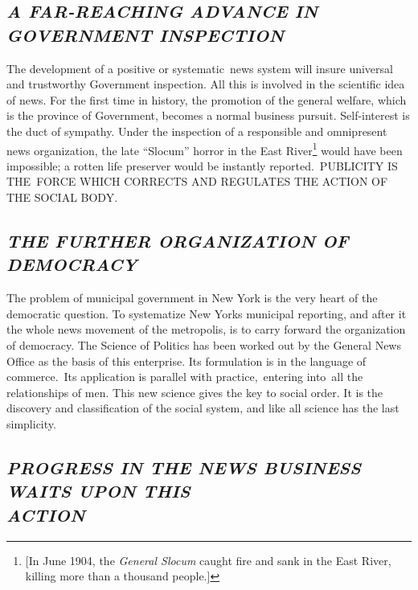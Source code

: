 \documentclass[twoside,symmetric,nobib,justified]{tufte-book}
\begin{document}
\hypertarget{a-far-reaching-advance-in-government-inspection}{%
\subsection{\emph{A FAR-REACHING ADVANCE IN GOVERNMENT
INSPECTION}}\label{a-far-reaching-advance-in-government-inspection}}

The development of a positive or systematic~news system will insure
universal and trustworthy Government inspection. All this is involved in
the scientific idea of news. For the first time in history, the
promotion of the general welfare, which is the province of Government,
becomes a normal business pursuit. Self-interest is the duct of
sympathy. Under the inspection of a responsible and omnipresent news
organization, the late ``Slocum'' horror in the East River\footnote{{[}In
  June 1904, the \emph{General Slocum} caught fire and sank in the East
  River, killing more than a thousand people.{]}} would have been
impossible; a rotten life preserver would be instantly
reported.~PUBLICITY IS THE~FORCE WHICH CORRECTS AND REGULATES THE ACTION
OF THE SOCIAL BODY.~

\hypertarget{the-further-organization-of-democracy}{%
\subsection{\emph{THE FURTHER ORGANIZATION OF
DEMOCRACY}}\label{the-further-organization-of-democracy}}

The problem of municipal government in New York is the very heart of the
democratic question. To systematize New York\textquotesingle s municipal
reporting, and after it the whole news movement of the metropolis, is to
carry forward the organization of democracy. The Science of Politics has
been worked out by the General News Office as the basis of this
enterprise. Its formulation is in the language of commerce.~Its
application is parallel with practice,~entering into~all the
relationships of men. This new science gives the key to social order. It
is the discovery and classification of the social system, and like all
science has the last simplicity.~

\hypertarget{progress-in-the-news-business-waits-upon-this-action}{%
\subsection{\emph{PROGRESS IN THE NEWS BUSINESS WAITS UPON THIS\\\noindent ACTION}}\label{progress-in-the-news-business-waits-upon-this-action}}
\end{document}
